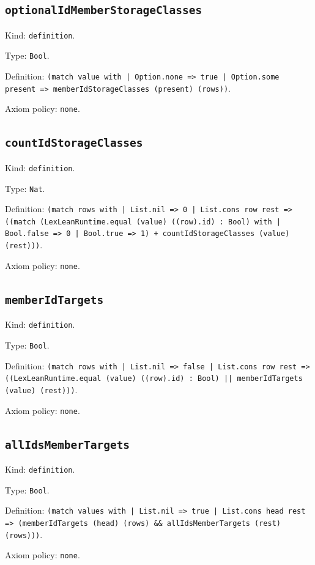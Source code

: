\documentclass[11pt]{article}
\begin{document}
\subsection*{\texttt{optionalIdMemberStorageClasses}}
\noindent Kind: \texttt{definition}.\par
\noindent Type: \texttt{Bool}.\par
\noindent Definition: \texttt{(match value with | Option.none => true | Option.some present => memberIdStorageClasses (present) (rows))}.\par
\noindent Axiom policy: \texttt{none}.\par
\subsection*{\texttt{countIdStorageClasses}}
\noindent Kind: \texttt{definition}.\par
\noindent Type: \texttt{Nat}.\par
\noindent Definition: \texttt{(match rows with | List.nil => 0 | List.cons row rest => ((match (LexLeanRuntime.equal (value) ((row).id) : Bool) with | Bool.false => 0 | Bool.true => 1) + countIdStorageClasses (value) (rest)))}.\par
\noindent Axiom policy: \texttt{none}.\par
\subsection*{\texttt{memberIdTargets}}
\noindent Kind: \texttt{definition}.\par
\noindent Type: \texttt{Bool}.\par
\noindent Definition: \texttt{(match rows with | List.nil => false | List.cons row rest => ((LexLeanRuntime.equal (value) ((row).id) : Bool) || memberIdTargets (value) (rest)))}.\par
\noindent Axiom policy: \texttt{none}.\par
\subsection*{\texttt{allIdsMemberTargets}}
\noindent Kind: \texttt{definition}.\par
\noindent Type: \texttt{Bool}.\par
\noindent Definition: \texttt{(match values with | List.nil => true | List.cons head rest => (memberIdTargets (head) (rows) \&\& allIdsMemberTargets (rest) (rows)))}.\par
\noindent Axiom policy: \texttt{none}.\par
\end{document}

